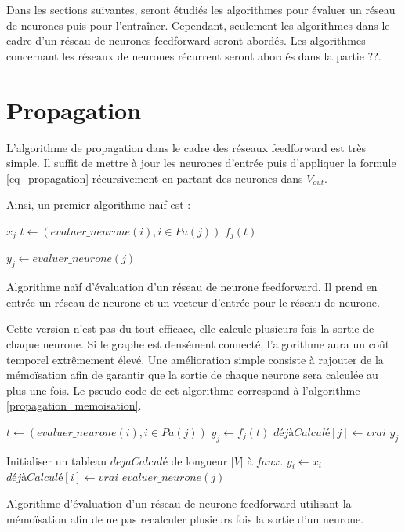Dans les sections suivantes, seront étudiés les algorithmes pour évaluer un réseau de neurones puis pour l’entraîner. Cependant, seulement les algorithmes dans le cadre d'un réseau de neurones feedforward seront abordés. Les algorithmes concernant les réseaux de neurones récurrent seront abordés dans la partie ??.

\section{Propagation}

L'algorithme de propagation dans le cadre des réseaux feedforward est très simple. Il suffit de mettre à jour les neurones d'entrée puis d'appliquer la formule \ref{eq_propagation} récursivement en partant des neurones dans $V_{out}$.

Ainsi, un premier algorithme naïf est :

\begin{algorithm} 
\begin{algorithmic}
    	\State \Return $x_j$
	\Else
		\State $t \leftarrow (evaluer\_neurone(i), i \in Pa(j))$
		\State \Return $f_j(t)$
	\EndIf
\EndFunction

	\State $y_j \leftarrow evaluer\_neurone(j)$ 
\EndFor
\EndProcedure
\end{algorithmic} 
\caption{Algorithme naïf d'évaluation d'un réseau de neurone feedforward. Il prend en entrée un réseau de neurone et un vecteur d'entrée pour le réseau de neurone.}
\end{algorithm}

Cette version n'est pas du tout efficace, elle calcule plusieurs fois la sortie de chaque neurone. Si le graphe est densément connecté, l'algorithme aura un coût temporel extrêmement élevé. Une amélioration simple consiste à rajouter de la mémoïsation afin de garantir que la sortie de chaque neurone sera calculée au plus une fois. Le pseudo-code de cet algorithme correspond à l'algorithme \ref{propagation_memoisation}.

\begin{algorithm} 
\begin{algorithmic}
		\State $t \leftarrow (evaluer\_neurone(i), i \in Pa(j))$
		\State $y_j \leftarrow f_j(t)$
		\State $déjàCalculé[j] \leftarrow vrai$
	\EndIf
	\State \Return $y_j$
\EndFunction

\State Initialiser un tableau $dejaCalculé$ de longueur $|V|$ à $faux$.
	\State $y_i \leftarrow x_i$
	\State $déjàCalculé[i] \leftarrow vrai$ 
\EndFor
{}
	\State $evaluer\_neurone(j)$ 
\EndFor
\EndProcedure
\end{algorithmic}
\caption{Algorithme d'évaluation d'un réseau de neurone feedforward utilisant la mémoïsation afin de ne pas recalculer plusieurs fois la sortie d'un neurone.}
\label{propagation_memoisation}
\end{algorithm}

